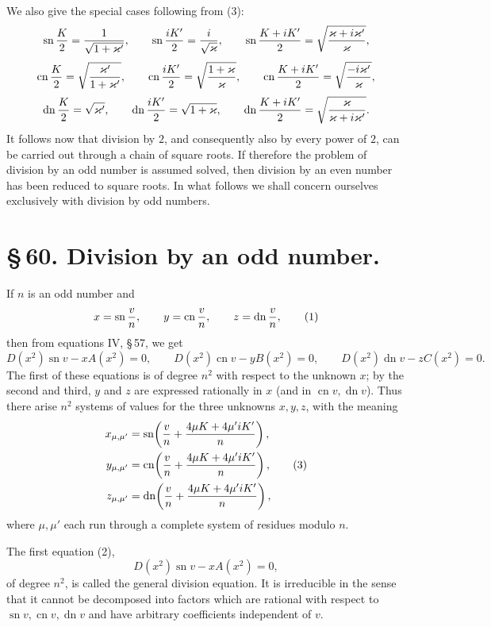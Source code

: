 \documentclass[11pt]{article}
\providecommand{\sn}{\operatorname{sn}}
\providecommand{\cn}{\operatorname{cn}}
\providecommand{\dn}{\operatorname{dn}}
\begin{document}
We also give the special cases following from (3):
\[
\sn {K\over2}={1\over\sqrt{1+\varkappa'}},\qquad
\sn {iK'\over2}={i\over\sqrt{\varkappa}},\qquad
\sn {K+iK'\over2}=\sqrt{{\varkappa+i\varkappa'}\over\varkappa},
\]
\[
\cn {K\over2}=\sqrt{{\varkappa'\over1+\varkappa'}},\qquad
\cn {iK'\over2}=\sqrt{{1+\varkappa\over\varkappa}},\qquad
\cn {K+iK'\over2}=\sqrt{{-i\varkappa'\over\varkappa}},
\]
\[
\dn {K\over2}=\sqrt{\varkappa'},\qquad
\dn {iK'\over2}=\sqrt{1+\varkappa},\qquad
\dn {K+iK'\over2}=\sqrt{{\varkappa\over\varkappa+i\varkappa'}}.
\]
It follows now that division by $2$, and consequently also by every power of $2$, can be
carried out through a chain of square roots. If therefore the problem of division by an odd
number is assumed solved, then division by an even number has been reduced to square
roots. In what follows we shall concern ourselves exclusively with division by odd numbers.

\section*{\S\,60. Division by an odd number.}

If $n$ is an odd number and
\begin{equation}
x=\sn {v\over n},\qquad y=\cn {v\over n},\qquad z=\dn {v\over n},
\tag{1}
\end{equation}
then from equations IV, \S\,57, we get
\begin{equation}
D(x^2)\sn v-xA(x^2)=0,\qquad
D(x^2)\cn v-yB(x^2)=0,\qquad
D(x^2)\dn v-zC(x^2)=0.
\tag{2}
\end{equation}
The first of these equations is of degree $n^2$ with respect to the unknown $x$; by the
second and third, $y$ and $z$ are expressed rationally in $x$ (and in $\cn v,\dn v$). Thus
there arise $n^2$ systems of values for the three unknowns $x,y,z$, with the meaning
\begin{equation}
\begin{aligned}
x_{\mu,\mu'}&=\sn\!\left({v\over n}+{4\mu K+4\mu'iK'\over n}\right),\\
y_{\mu,\mu'}&=\cn\!\left({v\over n}+{4\mu K+4\mu'iK'\over n}\right),\\
z_{\mu,\mu'}&=\dn\!\left({v\over n}+{4\mu K+4\mu'iK'\over n}\right),
\end{aligned}
\tag{3}
\end{equation}
where $\mu,\mu'$ each run through a complete system of residues modulo $n$.

The first equation (2),
\begin{equation}
D(x^2)\sn v-xA(x^2)=0,
\tag{4}
\end{equation}
of degree $n^2$, is called the general division equation. It is irreducible in the sense that
it cannot be decomposed into factors which are rational with respect to $\sn v,\cn v,\dn v$
and have arbitrary coefficients independent of $v$.
\end{document}
